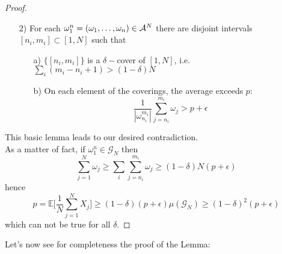 \begin{proof}
\begin{lemma}
\begin{itemize}
            \item[2)] For each $\omega_1^n = (\omega_1, \dots, \omega_n) \in \mathcal{A}^N$ there are disjoint intervals $[n_i, m_i] \subset [1,N]$ such that 
            \begin{itemize}
                \item[a)] $\{ [n_i,m_i] \}$ is a $\delta-$cover of $[1,N]$, i.e. $\sum_i (m_i - n_i +1) > (1 - \delta)N$
                \item[b)] On each element of the coverings, the average exceeds $p$:
                \begin{equation*}
                    \frac{1}{|\omega_{n_i}^{m_i}|} \sum_{j=n_i}^{m_i} \omega_j > p + \epsilon
                \end{equation*}
            \end{itemize}
        \end{itemize}
    \end{lemma}
    This basic lemma leads to our desired contradiction.
    \\As a matter of fact, if $\omega_1^n \in \mathcal{G}_N$ then 
    \begin{equation*}
        \sum_{j=1}^N \omega_j \geq \sum_i \sum_{j=n_i}^{m_i} \omega_j \geq (1 - \delta) N (p + \epsilon)
    \end{equation*}
    hence
    \begin{equation*}
        p = \mathbb{E} \bigg[ \frac{1}{N} \sum_{j=1}^N X_j \bigg] \geq (1 - \delta) (p + \epsilon) \mu(\mathcal{G}_N) \geq (1 - \delta)^2 (p+\epsilon)
    \end{equation*}
    which can not be true for all $\delta$.
\end{proof}
Let's now see for completeness the proof of the Lemma:
